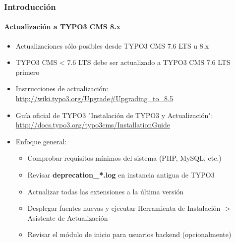 \begin{frame}[fragile]
	\frametitle{Introducción}
	\framesubtitle{Actualización a TYPO3 CMS 8.x}

	\begin{itemize}
		\item Actualizaciones sólo posibles desde TYPO3 CMS 7.6 LTS u 8.x
		\item TYPO3 CMS < 7.6 LTS debe ser actualizado a TYPO3 CMS 7.6 LTS primero
	\end{itemize}

	\begin{itemize}

		\item Instrucciones de actualización:\newline
			\smaller\url{http://wiki.typo3.org/Upgrade#Upgrading_to_8.5}\normalsize
		\item Guía oficial de TYPO3 "Instalación de TYPO3 y Actualización":
			\smaller\url{http://docs.typo3.org/typo3cms/InstallationGuide}\normalsize
		\item Enfoque general:
			\begin{itemize}
				\item Comprobar requisitos mínimos del sistema \small(PHP, MySQL, etc.)
				\item Revisar \textbf{deprecation\_*.log} en instancia antigua de TYPO3
				\item Actualizar todas las extensiones a la última versión
				\item Desplegar fuentes nuevas y ejecutar Herramienta de Instalación -> Asistente de Actualización
				\item Revisar el módulo de inicio para usuarios backend (opcionalmente)
			\end{itemize}
	\end{itemize}

\end{frame}


